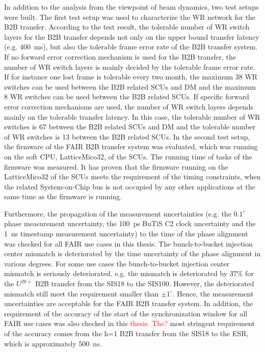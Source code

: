 In addition to the analysis from the viewpoint of beam dynamics, two test setups were built. The first test setup was used to characterize the WR network for the B2B transfer. According to the test result, the tolerable number of WR switch layers for the B2B transfer depends not only on the upper bound transfer latency (e.g. \SI{400}{\ms}), but also the tolerable frame error rate of the B2B transfer system. If no forward error correction mechanism is used for the B2B transfer, the number of WR switch layers is mainly decided by the tolerable frame error rate. If for instance one lost frame is tolerable every two month, the maximum 38 WR switches can be used between the B2B related SCUs and DM and the maximum 8 WR switches can be used between the B2B related SCUs. If specific forward error correction mechanisms are used, the number of WR switch layers depends mainly on the tolerable transfer latency. In this case, the tolerable number of WR switches is 67 between the B2B related SCUs and DM and the tolerable number of WR switches is 13 between the B2B related SCUs. In the second test setup, the firmware of the FAIR B2B transfer system was evaluated, which was running on the soft CPU, LatticeMico32, of the SCUs. The running time of tasks of the firmware was measured. It has proven that the firmware running on the LatticeMico32 of the SCUs meets the requirement of the timing constraints, when the related System-on-Chip bus is not occupied by any other applications at the same time as the firmware is running.

Furthermore, the propagation of the measurement uncertainties (e.g. the $0.1^\circ$ phase measurement uncertainty, the \SI{100}{ps} BuTiS C2 clock uncertainty and the \SI{1}{ns} timestamp measurement uncertainty) to the time of the phase alignment was checked for all FAIR use cases in this thesis. The bunch-to-bucket injection center mismatch is deteriorated by the time uncertainty of the phase alignment in various degrees. For some use cases the bunch-to-bucket injection center mismatch is seriously deteriorated. e.g. the mismatch is deteriorated by $37\%$ for the $U^\mathit{28+}$ B2B transfer from the SIS18 to the SIS100. However, the deteriorated mismatch still meet the requirement smaller than $\pm1^\circ$. Hence, the measurement uncertainties are acceptable for the FAIR B2B transfer system. In addition, the requirement of the accuracy of the start of the synchronization window for all FAIR use cases was also checked in this \textcolor{red}{thesis. The?} most stringent requirement of the accuracy comes from the h=1 B2B transfer from the SIS18 to the ESR, which is approximately \SI{500}{\ns}. 

